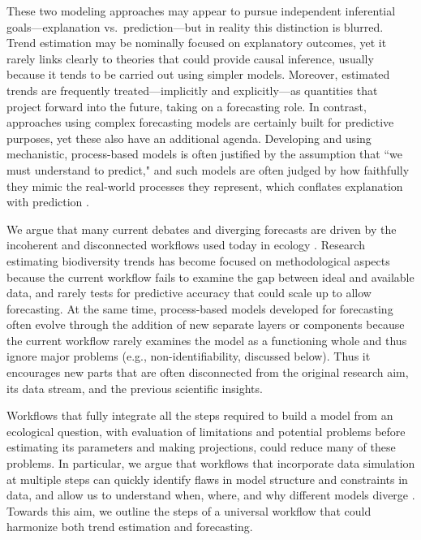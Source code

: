 \documentclass[11pt]{article}
\newcommand{\llabel}[1]{\hypertarget{lintarget:#1}{}\linelabel{lin:#1}}
\begin{document}
\llabel{inferentialgoal}These two modeling approaches may appear to pursue independent inferential goals---explanation vs.\ prediction---but in reality this distinction is blurred. Trend estimation may be nominally focused on explanatory outcomes, yet it rarely links clearly to theories that could provide causal inference, usually because it tends to be carried out using simpler models. Moreover,  estimated trends are frequently treated---implicitly and explicitly---as quantities that project forward into the future, taking on a forecasting role. %
In contrast, approaches using complex forecasting models are certainly built for predictive purposes, yet these also have an additional agenda. Developing and using mechanistic, process-based models is often justified by the assumption that ``we must understand to predict," and such models are often judged by how faithfully they mimic the real-world processes they represent, which conflates explanation with prediction \citep{Shmueli2010}.

We argue that many current debates and diverging forecasts are driven by the incoherent and disconnected workflows used today in ecology \citep{Loreau2022, Talis2023, Johnson2024}. Research estimating biodiversity trends has become focused on methodological aspects because the current workflow fails to examine the gap between ideal and available data, and rarely tests for predictive accuracy that could scale up to allow forecasting. At the same time, process-based models developed for forecasting often evolve through the addition of new separate layers or components because the current workflow rarely examines the model as a functioning whole and thus ignore major problems (e.g., non-identifiability, discussed below). Thus it encourages new parts that are often disconnected from the original research aim, its data stream, and the previous scientific insights. 

Workflows that fully integrate all the steps required to build a model from an ecological question, with evaluation of limitations and potential problems before estimating its parameters and making projections, could reduce many of these problems. In particular, we argue that workflows that incorporate data simulation at multiple steps can quickly identify flaws in model structure and constraints in data, and allow us to understand when, where, and why different models diverge \citep{McElreath2018, betanworkflow,Gelman2020,Schad2020,grinsztajn2021,vandeschoot2021,Wolkovich2024}. Towards this aim, we outline the steps of a universal workflow that could harmonize both trend estimation and forecasting.
\end{document}
